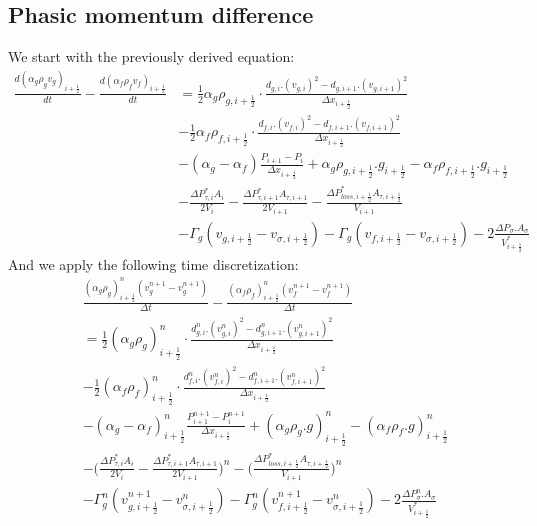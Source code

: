 \documentclass[11pt,letterpaper,titlepage]{article}
\newcommand{\half}{\frac{1}{2}}
\begin{document}
\newpage
\subsection{Phasic momentum difference}
We start with the previously derived equation:
\begin{equation*}
\begin{aligned}
\frac{d(\alpha_g\rho_g v_g)_{i+\half}}{dt}-\frac{d(\alpha_f\rho_f v_f)_{i+\half}}{dt}
&=\half \alpha_g \rho_{g,i+\half} \cdot\frac{d_{g,i}.(v_{g,i})^2-d_{g,i+1}.(v_{g,i+1})^2}{\Delta x_{i+\half}} \\
&-\half \alpha_f \rho_{f,i+\half} \cdot\frac{d_{f,i}.(v_{f,i})^2-d_{f,i+1}.(v_{f,i+1})^2}{\Delta x_{i+\half}} \\
&-(\alpha_g-\alpha_f)\frac{P_{i+1}-P_i}{\Delta x_{i+\half}} + \alpha_g \rho_{g,i+\half}.g_{i+\half} - \alpha_f\rho_{f,i+\half}.g_{i+\half}\\
&-\frac{\Delta P_{\tau,i}^*A_i}{2V_i}-\frac{\Delta P_{\tau,i+1}^*A_{\tau,i+1}}{2V_{i+1}} 
-\frac{\Delta P_{loss,i+\half}^*A_{\tau,i+\half}}{V_{i+1}}\\
& - \Gamma_g (v_{g,i+\half} - v_{\sigma,i+\half})- \Gamma_g (v_{f,i+\half} - v_{\sigma,i+\half})-2\frac{\Delta P_{\sigma}.A_{\sigma}}{V_{i+\half}^*}
\end{aligned}
\end{equation*}
\newline
\noindent
And we apply the following time discretization:
\begin{equation} \label{eq:diffmomm}
\begin{aligned}
&\frac{(\alpha_g\rho_g )_{i+\half}^n (v_g^{n+1} -v_g^{n+1})}{\Delta t}
-\frac{(\alpha_f\rho_f )_{i+\half}^n (v_f^{n+1} -v_f^{n+1})}{\Delta t}\\
&=\half (\alpha_g \rho_{g})_{i+\half}^n \cdot\frac{d_{g,i}^n.(v_{g,i}^n)^2-d_{g,i+1}^n.(v_{g,i+1}^n)^2}{\Delta x_{i+\half}} \\
&-\half (\alpha_f \rho_{f})_{i+\half}^n \cdot\frac{d_{f,i}^n.(v_{f,i}^n)^2-d_{f,i+1}^n.(v_{f,i+1}^n)^2}{\Delta x_{i+\half}} \\
&-(\alpha_g-\alpha_f)_{i+\half}^n\frac{P_{i+1}^{n+1}-P_i^{n+1} }{\Delta x_{i+\half}} + (\alpha_g \rho_{g}.g)_{i+\half}^n - (\alpha_f \rho_{f}.g)_{i+\half}^n \\
&-\biggr(\frac{\Delta P_{\tau,i}^*A_i}{2V_i}-\frac{\Delta P_{\tau,i+1}^*A_{\tau,i+1}}{2V_{i+1}}\biggr)^n 
-\biggr(\frac{\Delta P_{loss,i+\half}^*A_{\tau,i+\half}}{V_{i+1}}\biggr)^n\\
& - \Gamma_g^n (v_{g,i+\half}^{n+1} - v_{\sigma,i+\half}^n)- \Gamma_g^n (v_{f,i+\half}^{n+1} - v_{\sigma,i+\half}^n)-2\frac{\Delta P_{\sigma}^n.A_{\sigma}}{V_{i+\half}^*}
\end{aligned}
\end{equation}
\newline
\noindent
\end{document}

